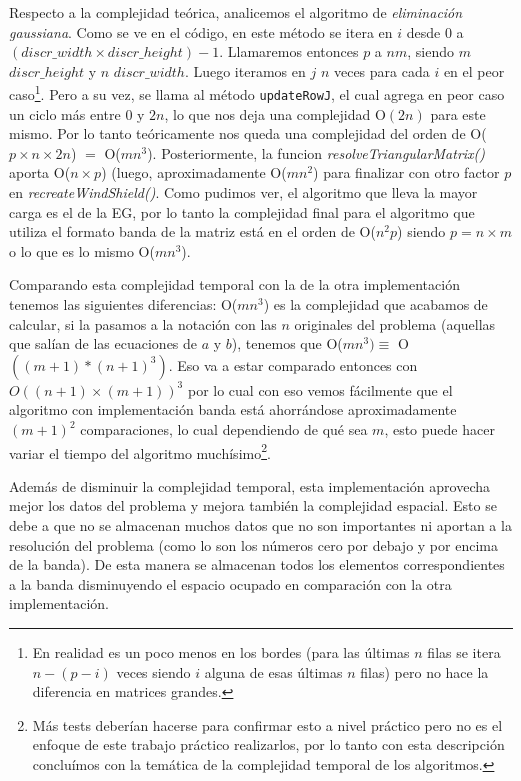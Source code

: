 Respecto a la complejidad teórica, analicemos el algoritmo de \textit{eliminación gaussiana}. Como se ve en el código, en este método se itera en $i$ desde 0 a \textit{$(discr\_width \times discr\_height) -1$}. Llamaremos entonces $p$ a $nm$, siendo $m$ \textit{$discr\_height$} y $n$ \textit{$discr\_width$}. Luego iteramos en $j$ $n$ veces para cada $i$ en el peor caso\footnote{En realidad es un poco menos en los bordes (para las últimas $n$ filas se itera $n-(p-i)$ veces siendo $i$ alguna de esas últimas $n$ filas) pero no hace la diferencia en matrices grandes.}. Pero a su vez, se llama al método \texttt{updateRowJ}, el cual agrega en peor caso un ciclo más entre $0$ y $2n$, lo que nos deja una complejidad O$(2n)$ para este mismo. Por lo tanto teóricamente nos queda una complejidad del orden de O($p \times n \times 2n$) $ = $ O($mn^3$). Posteriormente, la funcion \textit{resolveTriangularMatrix()} aporta O($n \times p$) (luego, aproximadamente O($mn^2$) para finalizar con otro factor $p$ en \textit{recreateWindShield()}. Como pudimos ver, el algoritmo que lleva la mayor carga es el de la EG, por lo tanto la complejidad final para el algoritmo que utiliza el formato banda de la matriz está en el orden de O($n^2p$) siendo $p = n \times m$ o lo que es lo mismo O($mn^3$). 

Comparando esta complejidad temporal con la de la otra implementación tenemos las siguientes diferencias: O($mn^3$) es la complejidad que acabamos de calcular, si la pasamos a la notación con las $n$ originales del problema (aquellas que salían de las ecuaciones de $a$ y $b$), tenemos que O($mn^3) \equiv $ O$((m+1)*(n+1)^3)$. Eso va a estar comparado entonces con $O((n+1) \times (m+1))^3$ por lo cual con eso vemos fácilmente que el algoritmo con implementación banda está ahorrándose aproximadamente $(m+1)^2$ comparaciones, lo cual dependiendo de qué sea $m$, esto puede hacer variar el tiempo del algoritmo muchísimo\footnote{Más tests deberían hacerse para confirmar esto a nivel práctico pero no es el enfoque de este trabajo práctico realizarlos, por lo tanto con esta descripción concluímos con la temática de la complejidad temporal de los algoritmos.}.

Además de disminuir la complejidad temporal, esta implementación aprovecha mejor los datos del problema y mejora también la complejidad espacial. Esto se debe a que no se almacenan muchos datos que no son importantes ni aportan a la resolución del problema (como lo son los números cero por debajo y por encima de la banda). De esta manera se almacenan todos los elementos correspondientes a la banda disminuyendo el espacio ocupado en comparación con la otra implementación.

